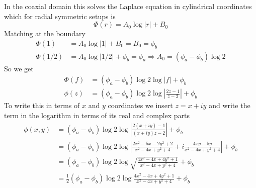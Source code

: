 \documentclass[a4paper,12pt]{article}
\begin{document}
In the coaxial domain this solves the Laplace equation in cylindrical coordinates which for radial symmetric setups is
\begin{equation}
	\Phi(r)=A_0\log|r|+B_0
\end{equation}
Matching at the boundary 
\begin{equation}
\begin{aligned}
\Phi(1)&=A_0\log|1|+B_0=B_0=\phi_b\\
\Phi(1/2)&=A_0\log|1/2|+\phi_b=\phi_a\Rightarrow A_0=(\phi_a-\phi_b)\log 2
\end{aligned}
\end{equation}
So we get 
\begin{equation}
	\begin{aligned}
	\Phi(f)&=(\phi_a-\phi_b)\log 2\log|f|+\phi_b \\
	\phi(z)&=(\phi_a-\phi_b)\log 2\log|\frac{2z-1}{z-2}|+\phi_b
\end{aligned}
\end{equation}
To write this in terms of $x$ and $y$ coordinates we insert $z=x+iy$ and write the term in the logarithm in terms of its real and complex parts
\begin{equation}
	\begin{aligned}
		\phi(x,y)&=(\phi_a-\phi_b)\log 2\log|\frac{2(x+iy)-1}{(x+iy)z-2}|+\phi_b\\
		&=(\phi_a-\phi_b)\log 2\log|\frac{2 x^2-5 x-2 y^2+2}{x^2-4 x+y^2+4}+i\frac{4 x y-5 y}{x^2-4 x+y^2+4}|+\phi_b
		\\
		&=(\phi_a-\phi_b)\log 2\log\sqrt{\frac{4 x^2-4 x+4 y^2+1}{x^2-4 x+y^2+4}}+\phi_b
		\\
		&=\frac{1}{2}(\phi_a-\phi_b)\log 2\log\frac{4 x^2-4 x+4 y^2+1}{x^2-4 x+y^2+4}+\phi_b
	\end{aligned}
\end{equation}
\end{document}
